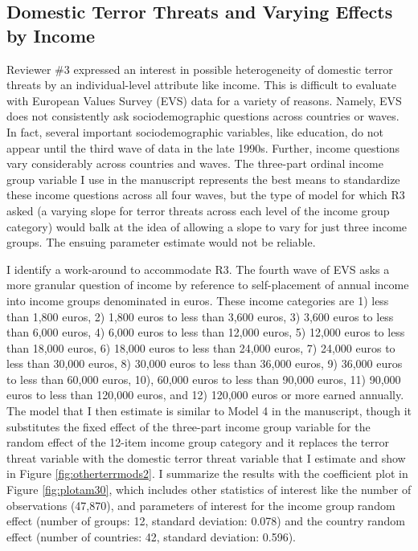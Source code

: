 \documentclass[11pt,]{article}
\begin{document}
\subsection{Domestic Terror Threats and Varying Effects by
Income}\label{domestic-terror-threats-and-varying-effects-by-income}

Reviewer \#3 expressed an interest in possible heterogeneity of domestic
terror threats by an individual-level attribute like income. This is
difficult to evaluate with European Values Survey (EVS) data for a
variety of reasons. Namely, EVS does not consistently ask
sociodemographic questions across countries or waves. In fact, several
important sociodemographic variables, like education, do not appear
until the third wave of data in the late 1990s. Further, income
questions vary considerably across countries and waves. The three-part
ordinal income group variable I use in the manuscript represents the
best means to standardize these income questions across all four waves,
but the type of model for which R3 asked (a varying slope for terror
threats across each level of the income group category) would balk at
the idea of allowing a slope to vary for just three income groups. The
ensuing parameter estimate would not be reliable.

I identify a work-around to accommodate R3. The fourth wave of EVS asks
a more granular question of income by reference to self-placement of
annual income into income groups denominated in euros. These income
categories are 1) less than 1,800 euros, 2) 1,800 euros to less than
3,600 euros, 3) 3,600 euros to less than 6,000 euros, 4) 6,000 euros to
less than 12,000 euros, 5) 12,000 euros to less than 18,000 euros, 6)
18,000 euros to less than 24,000 euros, 7) 24,000 euros to less than
30,000 euros, 8) 30,000 euros to less than 36,000 euros, 9) 36,000 euros
to less than 60,000 euros, 10), 60,000 euros to less than 90,000 euros,
11) 90,000 euros to less than 120,000 euros, and 12) 120,000 euros or
more earned annually. The model that I then estimate is similar to Model
4 in the manuscript, though it substitutes the fixed effect of the
three-part income group variable for the random effect of the 12-item
income group category and it replaces the terror threat variable with
the domestic terror threat variable that I estimate and show in Figure
\ref{fig:otherterrmods2}. I summarize the results with the coefficient
plot in Figure \ref{fig:plotam30}, which includes other statistics of
interest like the number of observations (47,870), and parameters of
interest for the income group random effect (number of groups: 12,
standard deviation: 0.078) and the country random effect (number of
countries: 42, standard deviation: 0.596).
\end{document}
